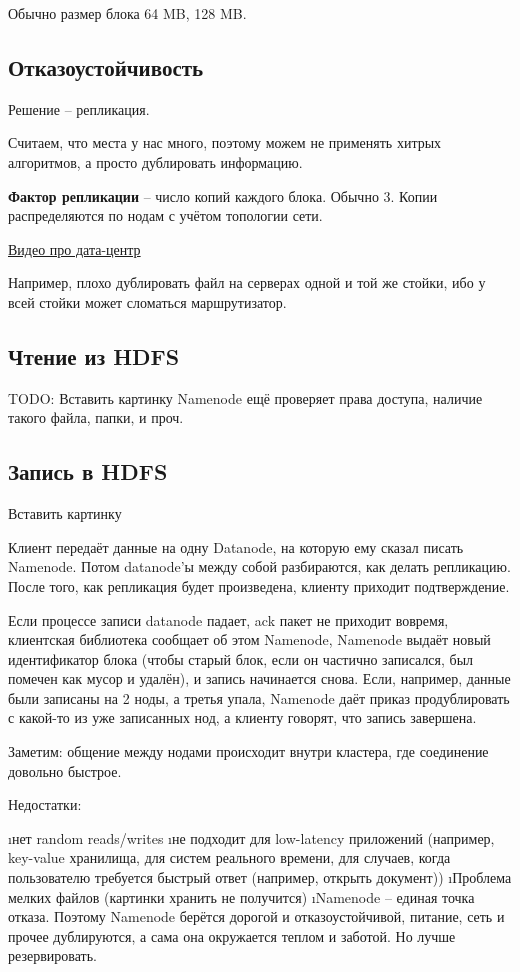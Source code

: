 Обычно размер блока 64 MB, 128 MB.

\subsection{Отказоустойчивость}
Решение -- репликация.

Считаем, что места у нас много, поэтому можем не применять хитрых алгоритмов, а просто дублировать информацию.

\textbf{Фактор репликации} -- число копий каждого блока. Обычно 3. Копии распределяются по нодам с учётом топологии сети.

 \href{https://youtu.be/-hE8jkyfqMw?t=2m55s}{Видео про дата-центр}
 
Например, плохо дублировать файл на серверах одной и той же стойки, ибо у всей стойки может сломаться маршрутизатор. 
 
\subsection{Чтение из HDFS}
TODO: Вставить картинку
Namenode ещё проверяет права доступа, наличие такого файла, папки, и проч.

\subsection{Запись в HDFS}
Вставить картинку

Клиент передаёт данные на одну Datanode, на которую ему сказал писать Namenode. Потом datanode'ы между собой разбираются, как делать репликацию. После того, как репликация будет произведена, клиенту приходит подтверждение. 

Если процессе записи datanode падает, ack пакет не приходит вовремя, клиентская библиотека сообщает об этом Namenode, Namenode выдаёт новый идентификатор блока (чтобы старый блок, если он частично записался, был помечен как мусор и удалён), и запись начинается снова.
Если, например, данные были записаны на 2 ноды, а третья упала, Namenode даёт приказ продублировать с какой-то из уже записанных нод, а клиенту говорят, что запись завершена. 

Заметим: общение между нодами происходит внутри кластера, где соединение довольно быстрое.

Недостатки:
\begin{enumerate}
	\i нет random reads/writes
	\i не подходит для low-latency приложений (например, key-value хранилища, для систем реального времени, для случаев, когда пользователю требуется быстрый ответ (например, открыть документ))
	\i Проблема мелких файлов (картинки хранить не получится)
	\i Namenode -- единая точка отказа. 
	Поэтому Namenode берётся дорогой и отказоустойчивой, питание, сеть и прочее дублируются, а сама она окружается теплом и заботой. Но лучше резервировать.
\end{enumerate}

